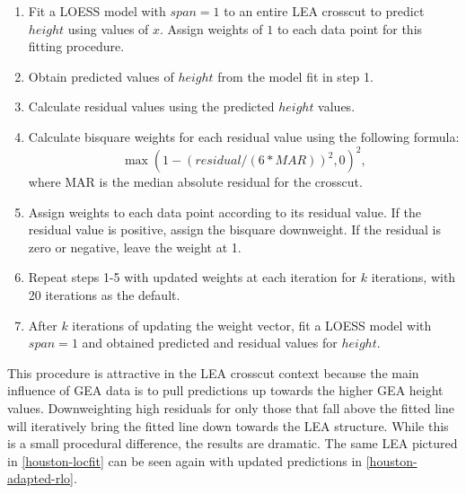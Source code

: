 \documentclass[12pt]{article}
\begin{document}
\begin{enumerate}

\item Fit a LOESS model with $span = 1$ to an entire LEA crosscut to predict $height$ using values of $x$. Assign weights of $1$ to each data point for this fitting procedure.  
\item Obtain predicted values of $height$ from the model fit in step 1.  
\item Calculate residual values using the predicted $height$ values.  
\item Calculate bisquare weights for each residual value using the following formula:  
$$\max(1 - (residual/(6*MAR))^2, 0)^2,$$   where MAR is the median absolute residual for the crosscut.  
\item Assign weights to each data point according to its residual value. If the residual value is positive, assign the bisquare downweight. If the residual is zero or negative, leave the weight at 1.  
\item Repeat steps 1-5 with updated weights at each iteration for $k$ iterations, with 20 iterations as the default.  
\item After $k$ iterations of updating the weight vector, fit a LOESS model with $span = 1$ and obtained predicted and residual values for $height$.  

\end{enumerate}

This procedure is attractive in the LEA crosscut context because the
main influence of GEA data is to pull predictions up towards the higher
GEA height values. Downweighting high residuals for only those that fall
above the fitted line will iteratively bring the fitted line down
towards the LEA structure. While this is a small procedural difference,
the results are dramatic. The same LEA pictured in
\autoref{houston-locfit} can be seen again with updated predictions in
\autoref{houston-adapted-rlo}.
\end{document}
